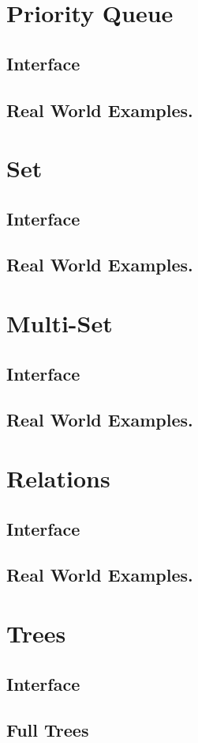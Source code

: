 \documentclass[12pt, letterpaper]{book}
\begin{document}
\section{Priority Queue}
	\subsection{Interface}
	\subsection{Real World Examples.}
\section{Set}
	\subsection{Interface}
	\subsection{Real World Examples.}
\section{Multi-Set}
	\subsection{Interface}
	\subsection{Real World Examples.}
\section{Relations}
	\subsection{Interface}
	\subsection{Real World Examples.}
\section{Trees}
	\subsection{Interface}
	\subsection{Full Trees}
\end{document}
